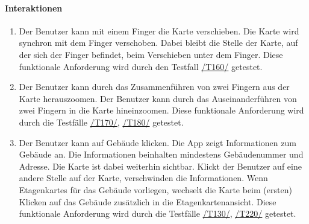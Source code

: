 \paragraph{Interaktionen}
\begin{enumerate}[start=12, label=\textbf{/FA\arabic*/}, align=left]
    \item \label{/FA12/} Der \Gls{Benutzer} kann mit einem Finger die \Gls{Karte} verschieben. Die \Gls{Karte} wird synchron mit dem Finger verschoben. Dabei bleibt die Stelle der \Gls{Karte}, auf der sich der Finger befindet, beim Verschieben unter dem Finger. Diese funktionale Anforderung wird durch den Testfall \hyperref[/T160/]{/T160/} getestet.
    \item \label{/FA13/} Der \Gls{Benutzer} kann durch das Zusammenführen von zwei Fingern aus der \Gls{Karte} herauszoomen. Der \Gls{Benutzer} kann durch das Auseinanderführen von zwei Fingern in die \Gls{Karte} hineinzoomen. Diese funktionale Anforderung wird durch die Testfälle \hyperref[/T170/]{/T170/}, \hyperref[/T180/]{/T180/} getestet.
    \item \label{/FA14/} Der \Gls{Benutzer} kann auf Gebäude klicken. Die App zeigt Informationen zum Gebäude an. Die Informationen beinhalten mindestens Gebäudenummer und Adresse. Die \Gls{Karte} ist dabei weiterhin sichtbar. Klickt der \Gls{Benutzer} auf eine andere Stelle auf der \Gls{Karte}, verschwinden die Informationen. Wenn \Glspl{Etagenkarte} für das Gebäude vorliegen, wechselt die \Gls{Karte} beim (ersten) Klicken auf das Gebäude zusätzlich in die \Gls{Etagenkartenansicht}. Diese funktionale Anforderung wird durch die Testfälle \hyperref[/T130/]{/T130/}, \hyperref[/T220/]{/T220/} getestet.
\end{enumerate}

